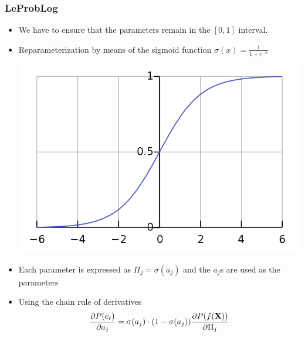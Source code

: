 \documentclass[trans,aspectratio=1610]{beamer}
\newcommand{\vecranvar}[1]{%
\ensuremath{\mathbf{\ranvar{#1}}}}
\newcommand{\ranvar}[1]{%
\ensuremath{{#1}}}
\begin{document}
\begin{frame}
 \frametitle{LeProbLog}
 
\begin{itemize}
\item We have to ensure that the parameters remain
in the $[0,1]$ interval. 
\item Reparameterization by means
of the sigmoid function 
$\sigma(x)=\frac{1}{1+e^{-x}}$ 
\begin{center}
\includegraphics[scale=0.28]{logistic.png}
\end{center}
\item Each parameter is expressed as $\Pi_j=\sigma(a_j)$
and the $a_j$s are used as the parameters
\item Using the chain rule of derivatives
$$\frac{\partial P(e_t)}{\partial a_j}=\sigma(a_j)\cdot(1-\sigma(a_j))\frac{\partial P(f(\vecranvar{X}))}{\partial \Pi_j}$$
\end{itemize}
\end{frame}
\end{document}
